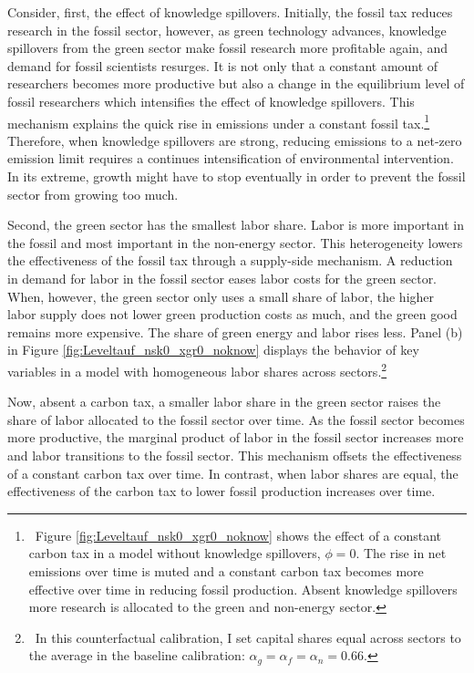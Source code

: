 Consider, first, the effect of knowledge spillovers.
Initially, the fossil tax reduces research in the fossil sector, however, as green technology advances, knowledge spillovers from the green sector make fossil research more profitable again, and demand for fossil scientists resurges.
It is not only that a constant amount of researchers becomes more productive but also a change in the equilibrium level of fossil researchers which intensifies the effect of knowledge spillovers. This mechanism explains the quick rise in emissions under a constant fossil tax.\footnote{\ Figure \ref{fig:Leveltauf_nsk0_xgr0_noknow} shows the effect of a constant carbon tax in a model without knowledge spillovers, $\phi=0$. The rise in net emissions over time is muted and a constant carbon tax becomes more effective over time in reducing fossil production.  Absent knowledge spillovers more research is allocated to the green and non-energy sector.} 
Therefore, when knowledge spillovers are strong, reducing emissions to a net-zero emission limit requires a continues intensification of environmental intervention. In its extreme, growth might have to stop eventually in order to prevent the fossil sector from growing too much.

Second, the green sector has the smallest labor share. Labor is more important in the fossil and most important in the non-energy sector. This heterogeneity lowers the effectiveness of the fossil tax through a supply-side mechanism. 
 A reduction in demand for labor in the fossil sector eases labor costs for the green sector. When, however, the green sector only uses a small share of labor, the higher labor supply does not lower green production costs as much, and the green good remains more expensive. The share of green energy and labor rises less. Panel (b)  in Figure \ref{fig:Leveltauf_nsk0_xgr0_noknow} displays the behavior of key variables in a model with homogeneous labor shares across sectors.\footnote{\ In this counterfactual calibration, I set capital shares equal across sectors to the average in the baseline calibration: $\alpha_g=\alpha_f=\alpha_n=0.66$. }


Now, absent a carbon tax, a smaller labor share in the green sector raises the share of labor allocated to the fossil sector over time. As the fossil sector becomes more productive, the marginal product of labor in the fossil sector increases more and labor transitions to the fossil sector. This mechanism offsets the effectiveness of a constant carbon tax over time. In contrast, when labor shares are equal, the effectiveness of the carbon tax to lower fossil production increases over time. 



